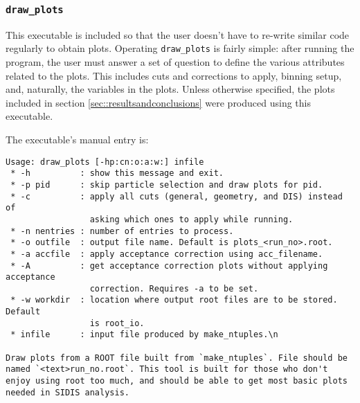\subsubsection{\texttt{draw\_plots}}
\label{sssec::draw_plots}
    This executable is included so that the user doesn't have to re-write similar code regularly to obtain plots.
    Operating \texttt{draw\_plots} is fairly simple: after running the program, the user must answer a set of question to define the various attributes related to the plots.
    This includes cuts and corrections to apply, binning setup, and, naturally, the variables in the plots.
    Unless otherwise specified, the plots included in section \ref{sec::resultsandconclusions} were produced using this executable.

    The executable's manual entry is:
    \begin{lstlisting}
Usage: draw_plots [-hp:cn:o:a:w:] infile
 * -h          : show this message and exit.
 * -p pid      : skip particle selection and draw plots for pid.
 * -c          : apply all cuts (general, geometry, and DIS) instead of
                 asking which ones to apply while running.
 * -n nentries : number of entries to process.
 * -o outfile  : output file name. Default is plots_<run_no>.root.
 * -a accfile  : apply acceptance correction using acc_filename.
 * -A          : get acceptance correction plots without applying acceptance
                 correction. Requires -a to be set.
 * -w workdir  : location where output root files are to be stored. Default
                 is root_io.
 * infile      : input file produced by make_ntuples.\n

Draw plots from a ROOT file built from `make_ntuples`. File should be named `<text>run_no.root`. This tool is built for those who don't enjoy using root too much, and should be able to get most basic plots needed in SIDIS analysis.
    \end{lstlisting}
